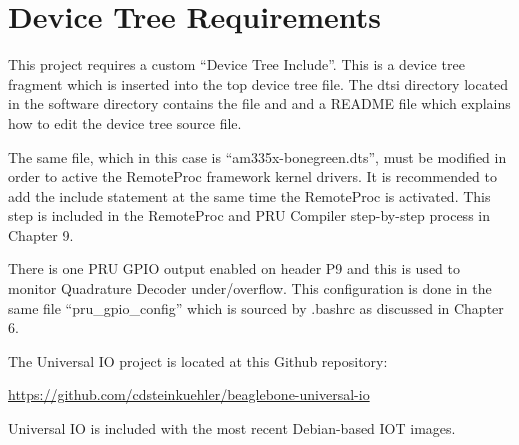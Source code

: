 %
%
%

\chapter{Device Tree Requirements}

This project requires a custom ``Device Tree Include''.  This is a device tree fragment which is inserted into the top device tree file.  The dtsi directory located in the software directory contains the file and and a README file which explains how to edit the device tree source file.

The same file, which in this case is ``am335x-bonegreen.dts'', must be modified in order to active the RemoteProc framework kernel drivers.  It is recommended to add the include statement at the same time the RemoteProc is activated.  This step is included in the RemoteProc and PRU Compiler step-by-step process in Chapter 9.

There is one PRU GPIO output enabled on header P9 and this is used to monitor Quadrature Decoder under/overflow.  This configuration is done in the same file ``pru\_gpio\_config'' which is sourced by .bashrc as discussed in Chapter 6.

The Universal IO project is located at this Github repository:

\url{https://github.com/cdsteinkuehler/beaglebone-universal-io}

Universal IO is included with the most recent Debian-based IOT images.




